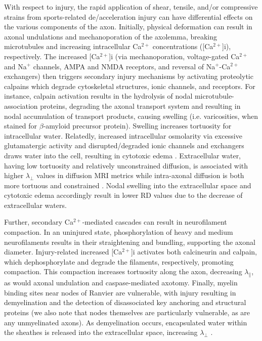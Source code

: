 \documentclass[12pt]{article}
\begin{document}
With respect to injury, the rapid application of shear, tensile, and/or compressive strains from sports-related de/acceleration injury can have differential effects on the various components of the axon. Initially, physical deformation can result in axonal undulations and mechanoporation of the axolemma, breaking microtubules and increasing intracellular Ca$^{2+}$ concentrations ([Ca$^{2+}$]i), respectively. The increased [Ca$^{2+}$]i (via mechanoporation, voltage-gated Ca$^{2+}$ and Na$^+$ channels, AMPA and NMDA receptors, and reversal of Na$^+$-Ca$^{2+}$ exchangers) then triggers secondary injury mechanisms by activating proteolytic calpains which degrade cytoskeletal structures, ionic channels, and receptors. For instance, calpain activation results in the hydrolysis of nodal microtubule-association proteins, degrading the axonal transport system and resulting in nodal accumulation of transport products, causing swelling (i.e. varicosities, when stained for $\beta$-amyloid precursor protein). Swelling increases tortuosity for intracellular water. Relatedly, increased intracellular osmolarity via excessive glutamatergic activity and disrupted/degraded ionic channels and exchangers draws water into the cell, resulting in cytotoxic edema \parencite{rungta2015CellularMechanismsNeuronal}. Extracellular water, having low tortuosity and relatively unconstrained diffusion, is associated with higher $\lambda_\perp$ values in diffusion MRI metrics while intra-axonal diffusion is both more tortuous and constrained \parencite{mayer2010ProspectiveDiffusionTensor,rosenblum2007CytotoxicEdemaMonitoring}. Nodal swelling into the extracellular space and cytotoxic edema accordingly result in lower RD values due to the decrease of extracellular waters.

Further, secondary Ca$^{2+}$-mediated cascades can result in neurofilament compaction. In an uninjured state, phosphorylation of heavy and medium neurofilaments results in their straightening and bundling, supporting the axonal diameter. Injury-related increased [Ca$^{2+}$]i activates both calcineurin and calpain, which dephosphorylate and degrade the filaments, respectively, promoting compaction. This compaction increases tortuosity along the axon, decreasing $\lambda_\parallel$, as would axonal undulation and caspase-mediated axotomy. Finally, myelin binding sites near nodes of Ranvier are vulnerable, with injury resulting in demyelination and the detection of disassociated key anchoring and structural proteins (we also note that nodes themselves are particularly vulnerable, as are any unmyelinated axons). As demyelination occurs, encapsulated water within the sheathes is released into the extracellular space, increasing $\lambda_\perp$ \parencite{mayer2010ProspectiveDiffusionTensor}.
\end{document}
